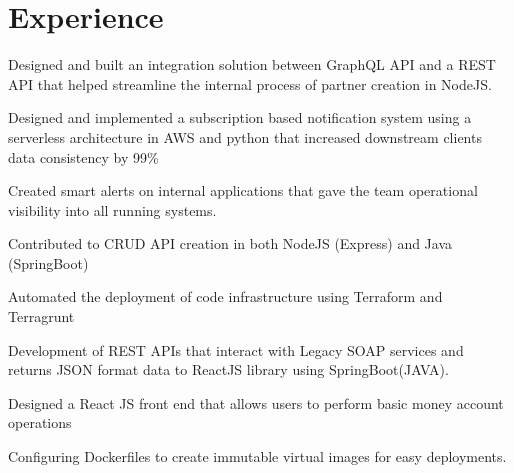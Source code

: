 \documentclass[]{deedy-resume-openfont}
\begin{document}
\begin{minipage}[t][18cm]{0.66\textwidth}


\section{Experience}

\vspace{\topsep} %
\begin{tightemize}
\item Designed and built an integration solution between GraphQL API and a REST API that helped streamline the internal process of partner creation in NodeJS.
\item Designed and implemented a subscription based notification system using a serverless architecture in AWS and python that increased downstream clients data consistency by 99\%
\item Created smart alerts on internal applications that gave the team operational visibility into all running systems.
\item Contributed to CRUD API creation in both NodeJS (Express) and Java (SpringBoot)
\item Automated the deployment of code infrastructure using Terraform and Terragrunt

\end{tightemize}
\sectionsep


\begin{tightemize}
\item Development of REST APIs that interact with Legacy SOAP services and returns JSON format data to ReactJS library using SpringBoot(JAVA).
\item Designed a React JS front end that allows users to perform basic money account operations
\item Configuring Dockerfiles to create immutable virtual images for easy deployments.


\end{tightemize}
\sectionsep


\end{minipage}
\end{document}
